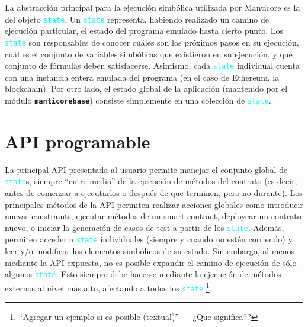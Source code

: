 La abstracción principal para la ejecución simbólica utilizada por Manticore es la del objeto \textcolor{cyan}{\texttt{state}}.
Un \textcolor{cyan}{\texttt{state}} representa, habiendo realizado un camino de ejecución particular, el estado del programa emulado hasta cierto punto.
Los \textcolor{cyan}{\texttt{state}} son responsables de conocer cuáles son los próximos pasos en su ejecución, cuál es el conjunto de variables simbólicas que existieron en su ejecución, y qué conjunto de fórmulas deben satisfacerse.
Asimismo, cada \textcolor{cyan}{\texttt{state}} individual cuenta con una instancia entera emulada del programa (en el caso de Ethereum, la blockchain).
Por otro lado, el estado global de la aplicación (mantenido por el módulo \texttt{\textbf{manticorebase}}) consiste simplemente en una colección de \textcolor{cyan}{\texttt{state}}.

\section{API programable}
\label{sec:api-manticore}
La principal API presentada al usuario permite manejar el conjunto global de \textcolor{cyan}{\texttt{state}}s, siempre ``entre medio'' de la ejecución de métodos del contrato (es decir, antes de comenzar a ejecutarlos o después de que terminen, pero no durante).
Los principales métodos de la API permiten realizar acciones globales como introducir nuevas constraints, ejecutar métodos de un smart contract, deployear un contrato nuevo, o iniciar la generación de casos de test a partir de los \textcolor{cyan}{\texttt{state}}.
Además, permiten acceder a \textcolor{cyan}{\texttt{state}} individuales (siempre y cuando no estén corriendo) y leer y/o modificar los elementos simbólicos de su estado.
Sin embargo, al menos mediante la API expuesta, no es posible expandir el camino de ejecución de sólo algunos \textcolor{cyan}{\texttt{state}}.
Esto siempre debe hacerse mediante la ejecución de métodos externos al nivel más alto, afectando a todos los \textcolor{cyan}{\texttt{state}} \footnote{``Agregar un ejemplo si es posible (textual)'' --- ¿Que significa??}.

